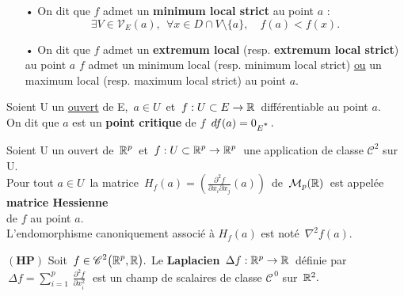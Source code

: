 \begin{itemize}[leftmargin=0.5cm]
    \item[•] On dit que $f$ admet un \textbf{minimum local strict} au point $a$ \ssi :\vspace{-0.3cm}\\
    \[\exists V\!\in \mathcal{V}_E(a),\ \  \forall x\in D\cap V\setminus\!\{a\},\quad f(a)< f(x).\]\vspace{-0.3cm}

    \item[•] On dit que $f$ admet un \textbf{extremum local} (resp. \textbf{extremum local strict}) au point $a$ \ssi $f$ admet un minimum local (resp. minimum local strict) \underline{ou} un maximum local (resp. maximum local strict) au point $a$.
\end{itemize}

\vspace{1cm}

Soient U un \underline{ouvert} de E, \(\,a\in U\,\) et \(\,f:U\subset E\to \mathbb{R}\,\) différentiable au point $a$.\vspace{0.1cm}\\
On dit que $a$ est un \textbf{point critique} de $f$ \ssi \(\,df(a)=0_{E\textsuperscript{*}}\,.\)

\vspace{1.3cm}

Soient U un ouvert de \(\displaystyle\,\mathbb{R}^p\,\) et \(\displaystyle\,f:U\subset \mathbb{R}^p\to \mathbb{R}^p\,\) une application de classe $\mathscr{C}^2$ sur U.\vspace{0.2cm}\\
Pour tout \(a\in U\,\) la matrice \(\,\displaystyle H_f(a)=\left(\frac{\partial^2\!f}{\partial x_i\partial x_j}(a)\!\right)\,\) de \(\,\mathcal{M}_p(\mathbb{R})\,\) est appelée \textbf{matrice Hessienne}\vspace{-0.1cm}\\
de $f$ au point $a$.\vspace{0.2cm}\\
L'endomorphisme canoniquement associé à $H_f(a)$ est noté \(\,\nabla ^2f(a).\)

\vspace{1.2cm}

\(\left(\mathbf{HP}\right)\) Soit \(\,\displaystyle f \in \mathscr{C}^2\bigl(\mathbb{R}^p,\mathbb{R}\bigr).\) Le \textbf{Laplacien} \(\,\Delta f:\mathbb{R}^p\to \mathbb{R}\,\) définie par \(\,\displaystyle \Delta f=\displaystyle\sum_{i=1}^p \,\frac{\partial^2\!f}{\partial x_i^2}\;\) est un champ de scalaires de classe $\mathscr{C}^{\,0}$ sur \(\,\mathbb{R}^2.\)

